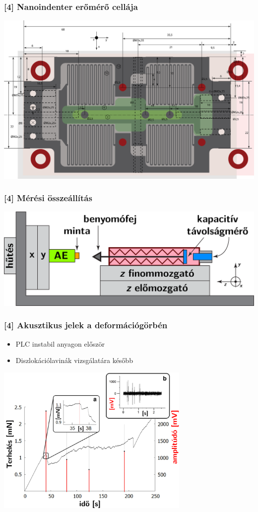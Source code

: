 \documentclass[12pt]{beamer}
\begin{document}
\begin{frame}
\frametitle{[4] Nanoindenter erőmérő cellája}
\centering
\includegraphics[width=1\textwidth]{figs/nagy_nanoindenter_korrig_forgatva.png} 
\end{frame}


\begin{frame}
\frametitle{[4] Mérési összeállítás}
\centering
\includegraphics[width=1\textwidth]{figs/vazlat.png} 
\end{frame}


\begin{frame}
\frametitle{[4] Akusztikus jelek a deformációgörbén}
\begin{itemize}
\item PLC instabil anyagon először
\item Diszlokációlavinák vizsgálatára később
\end{itemize}
\centering
\includegraphics[width=0.7\textwidth]{figs/Micron_Scale_Deformation.png} 
\end{frame}
\end{document}
